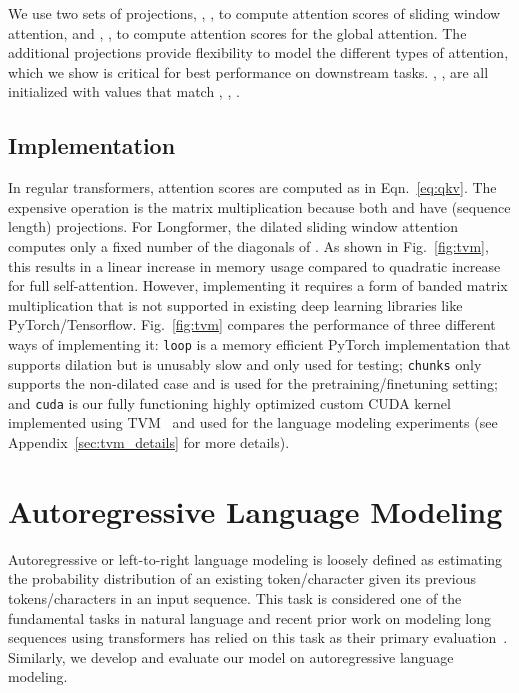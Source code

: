 \documentclass[11pt,a4paper]{article}
\newcommand{\model}{Longformer\xspace}
\begin{document}
We use two sets of projections, , ,  to compute attention scores of sliding window attention, and  , ,  to  compute attention scores for the global attention.
The additional projections provide flexibility to model the different types of attention, which we show is critical for best performance on downstream tasks. 
, ,  are all initialized with values that match
 , , . 




\subsection{Implementation}
\label{sec:tvm}
In regular transformers, attention scores are computed as in Eqn.~\ref{eq:qkv}. 
The expensive operation is the matrix multiplication  because both
 and  have  (sequence length) projections. 
For \model, the dilated sliding window attention computes only a fixed number of the diagonals 
of . As shown in Fig.~\ref{fig:tvm}, this results in a linear increase 
in memory usage compared to quadratic increase for full self-attention.
However, implementing it requires a form of banded matrix multiplication that is not supported in 
existing deep learning libraries like PyTorch/Tensorflow.
Fig.~\ref{fig:tvm} compares the performance of three different ways of implementing it:
\texttt{loop} is a memory efficient PyTorch implementation that supports dilation but is unusably slow and only used for testing;
\texttt{chunks} only supports the non-dilated case and is used for 
the pretraining/finetuning setting;
and \texttt{cuda} is our fully functioning highly optimized custom CUDA kernel implemented using TVM~\cite{tvm} and used for the language modeling experiments (see  Appendix~\ref{sec:tvm_details} for more details).
 \section{Autoregressive Language Modeling}
Autoregressive or left-to-right language modeling is loosely defined as estimating the probability distribution of an existing token/character given its previous tokens/characters in an input sequence. 
This task is considered one of the fundamental tasks in natural language and recent prior work on modeling long sequences using transformers 
has relied on this task as their primary evaluation~\cite{transformerxl,compressive,adaptivespan}.
Similarly, we develop and evaluate our model on autoregressive language modeling. 
\end{document}
